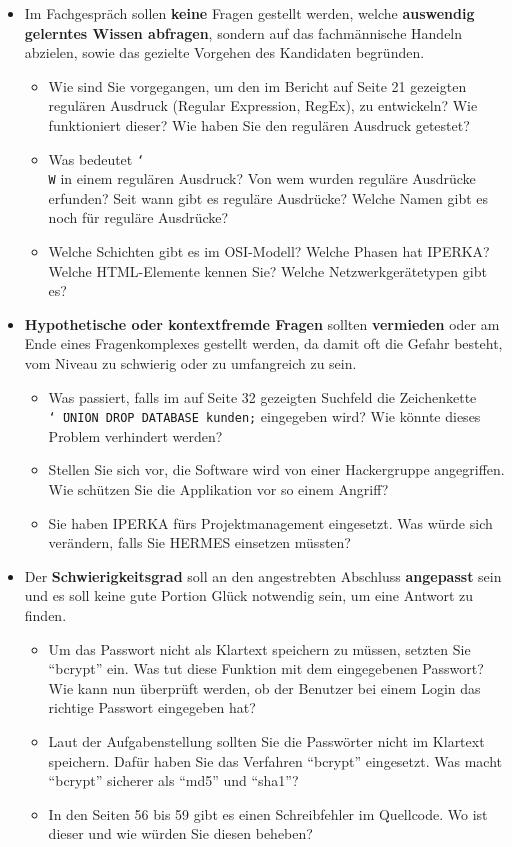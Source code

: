\begin{itemize}
  \item Im Fachgespräch sollen \textbf{keine} Fragen gestellt werden, welche \textbf{auswendig gelerntes Wissen abfragen}, sondern auf das fachmännische Handeln abzielen, sowie das gezielte Vorgehen des Kandidaten begründen.
  \begin{itemize}
    \item[\ding{51}] Wie sind Sie vorgegangen, um den im Bericht auf Seite 21 gezeigten regulären Ausdruck (Regular Expression, RegEx), zu entwickeln? Wie funktioniert dieser? Wie haben Sie den regulären Ausdruck getestet?
    \item[\ding{55}] Was bedeutet \texttt{\char`\\W} in einem regulären Ausdruck? Von wem wurden reguläre Ausdrücke erfunden? Seit wann gibt es reguläre Ausdrücke? Welche Namen gibt es noch für reguläre Ausdrücke?
    \item[\ding{55}] Welche Schichten gibt es im OSI-Modell? Welche Phasen hat IPERKA? Welche HTML-Elemente kennen Sie? Welche Netzwerkgerätetypen gibt es?
  \end{itemize}
  \item \textbf{Hypothetische oder kontextfremde Fragen} sollten \textbf{vermieden} oder am Ende eines Fragenkomplexes gestellt werden, da damit oft die Gefahr besteht, vom Niveau zu schwierig oder zu umfangreich zu sein.
  \begin{itemize}
    \item[\ding{51}] Was passiert, falls im auf Seite 32 gezeigten Suchfeld die Zeichenkette \texttt{\char`\"\ UNION DROP DATABASE kunden;} eingegeben wird? Wie könnte dieses Problem verhindert werden?
    \item[\ding{55}] Stellen Sie sich vor, die Software wird von einer Hackergruppe angegriffen. Wie schützen Sie die Applikation vor so einem Angriff?
    \item[\ding{55}] Sie haben IPERKA fürs Projektmanagement eingesetzt. Was würde sich verändern, falls Sie HERMES einsetzen müssten?
  \end{itemize}
  \item Der \textbf{Schwierigkeitsgrad} soll an den angestrebten Abschluss \textbf{angepasst} sein und es soll keine gute Portion Glück notwendig sein, um eine Antwort zu finden.
  \begin{itemize}
    \item[\ding{51}] Um das Passwort nicht als Klartext speichern zu müssen, setzten Sie \enquote{bcrypt} ein. Was tut diese Funktion mit dem eingegebenen Passwort? Wie kann nun überprüft werden, ob der Benutzer bei einem Login das richtige Passwort eingegeben hat?
    \item[\ding{55}] Laut der Aufgabenstellung sollten Sie die Passwörter nicht im Klartext speichern. Dafür haben Sie das Verfahren \enquote{bcrypt} eingesetzt. Was macht \enquote{bcrypt} sicherer als \enquote{md5} und \enquote{sha1}?
    \item[\ding{55}] In den Seiten 56 bis 59 gibt es einen Schreibfehler im Quellcode. Wo ist dieser und wie würden Sie diesen beheben?
  \end{itemize}
\end{itemize}
